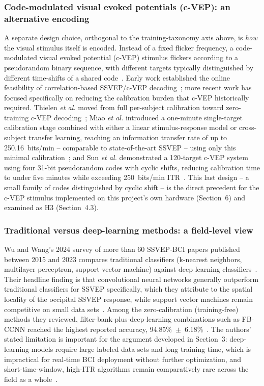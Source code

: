 \documentclass[11pt]{article}
\begin{document}
\subsubsection{Code-modulated visual evoked potentials (c-VEP): an alternative encoding}

A separate design choice, orthogonal to the training-taxonomy axis above, is \emph{how} the visual stimulus itself is encoded. Instead of a fixed flicker frequency, a code-modulated visual evoked potential (c-VEP) stimulus flickers according to a pseudorandom binary sequence, with different targets typically distinguished by different time-shifts of a shared code~\cite{martinezcagigal2021cvepreview}. Early work established the online feasibility of correlation-based SSVEP/c-VEP decoding~\cite{bin2009online}; more recent work has focused specifically on reducing the calibration burden that c-VEP historically required. Thielen \textit{et al.} moved from full per-subject calibration toward zero-training c-VEP decoding~\cite{thielen2021zerotraining}; Miao \textit{et al.} introduced a one-minute single-target calibration stage combined with either a linear stimulus-response model or cross-subject transfer learning, reaching an information transfer rate of up to 250.16~bits/min -- comparable to state-of-the-art SSVEP -- using only this minimal calibration~\cite{miao2024cvepminimal}; and Sun \textit{et al.} demonstrated a 120-target c-VEP system using four 31-bit pseudorandom codes with cyclic shifts, reducing calibration time to under five minutes while exceeding 250~bits/min ITR~\cite{sun2022cyclicshift}. This last design -- a small family of codes distinguished by cyclic shift -- is the direct precedent for the c-VEP stimulus implemented on this project's own hardware (Section~6) and examined as H3 (Section~4.3).

\subsubsection{Traditional versus deep-learning methods: a field-level view}

Wu and Wang's 2024 survey of more than 60 SSVEP-BCI papers published between 2015 and 2023 compares traditional classifiers (k-nearest neighbors, multilayer perceptron, support vector machine) against deep-learning classifiers~\cite{wu2024analysis}. Their headline finding is that convolutional neural networks generally outperform traditional classifiers for SSVEP specifically, which they attribute to the spatial locality of the occipital SSVEP response, while support vector machines remain competitive on small data sets~\cite{wu2024analysis}. Among the zero-calibration (training-free) methods they reviewed, filter-bank-plus-deep-learning combinations such as FB-CCNN reached the highest reported accuracy, 94.85\%~$\pm$~6.18\%~\cite{wu2024analysis}. The authors' stated limitation is important for the argument developed in Section~3: deep-learning models require large labeled data sets and long training time, which is impractical for real-time BCI deployment without further optimization, and short-time-window, high-ITR algorithms remain comparatively rare across the field as a whole~\cite{wu2024analysis}.
\end{document}
